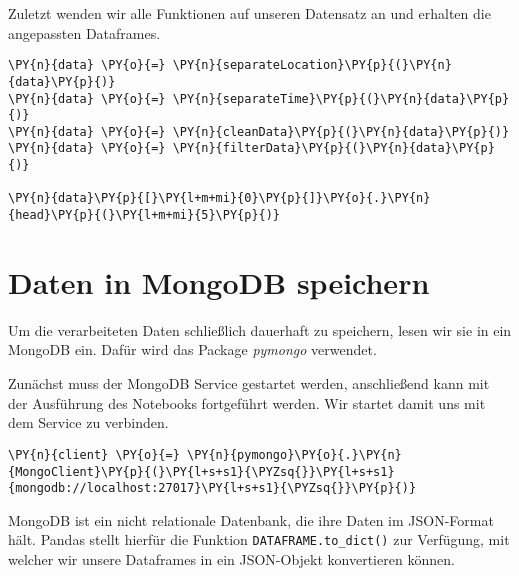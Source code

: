     Zuletzt wenden wir alle Funktionen auf unseren Datensatz an und erhalten
die angepassten Dataframes.

    \begin{tcolorbox}[breakable, size=fbox, boxrule=1pt, pad at break*=1mm,colback=cellbackground, colframe=cellborder]
\begin{Verbatim}[commandchars=\\\{\}]
\PY{n}{data} \PY{o}{=} \PY{n}{separateLocation}\PY{p}{(}\PY{n}{data}\PY{p}{)}
\PY{n}{data} \PY{o}{=} \PY{n}{separateTime}\PY{p}{(}\PY{n}{data}\PY{p}{)}
\PY{n}{data} \PY{o}{=} \PY{n}{cleanData}\PY{p}{(}\PY{n}{data}\PY{p}{)}
\PY{n}{data} \PY{o}{=} \PY{n}{filterData}\PY{p}{(}\PY{n}{data}\PY{p}{)}

\PY{n}{data}\PY{p}{[}\PY{l+m+mi}{0}\PY{p}{]}\PY{o}{.}\PY{n}{head}\PY{p}{(}\PY{l+m+mi}{5}\PY{p}{)}
\end{Verbatim}
\end{tcolorbox}

    \hypertarget{daten-in-mongodb-speichern}{%
\section{Daten in MongoDB speichern}\label{daten-in-mongodb-speichern}}

    Um die verarbeiteten Daten schließlich dauerhaft zu speichern, lesen wir
sie in ein MongoDB ein. Dafür wird das Package \emph{pymongo} verwendet.

Zunächst muss der MongoDB Service gestartet werden, anschließend kann
mit der Ausführung des Notebooks fortgeführt werden. Wir startet damit
uns mit dem Service zu verbinden.

    \begin{tcolorbox}[breakable, size=fbox, boxrule=1pt, pad at break*=1mm,colback=cellbackground, colframe=cellborder]
\begin{Verbatim}[commandchars=\\\{\}]
\PY{n}{client} \PY{o}{=} \PY{n}{pymongo}\PY{o}{.}\PY{n}{MongoClient}\PY{p}{(}\PY{l+s+s1}{\PYZsq{}}\PY{l+s+s1}{mongodb://localhost:27017}\PY{l+s+s1}{\PYZsq{}}\PY{p}{)}
\end{Verbatim}
\end{tcolorbox}

    MongoDB ist ein nicht relationale Datenbank, die ihre Daten im
JSON-Format hält. Pandas stellt hierfür die Funktion
\texttt{DATAFRAME.to\_dict()} zur Verfügung, mit welcher wir unsere
Dataframes in ein JSON-Objekt konvertieren können.


